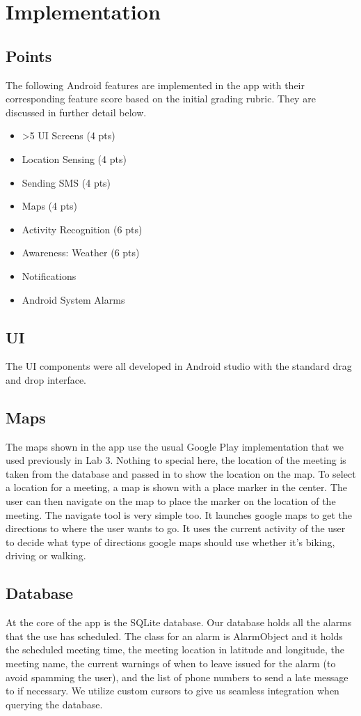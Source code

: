 \section{Implementation}
\subsection{Points}
The following Android features are implemented in the app with their corresponding feature score based on the initial grading rubric.  They are discussed in further detail below.

\begin {itemize}
	\item >5 UI Screens (4 pts)
	\item Location Sensing (4 pts)
	\item Sending SMS (4 pts)
	\item Maps (4 pts)
	\item Activity Recognition (6 pts)
	\item Awareness: Weather (6 pts)
	\item Notifications
	\item Android System Alarms
\end {itemize}

\subsection{UI}
The UI components were all developed in Android studio with the standard drag and drop interface. 

\subsection{Maps}
The maps shown in the app use the usual Google Play implementation that we used previously in Lab 3. Nothing to special here, the location of the meeting is taken from the database and passed in to show the location on the map. To select a location for a meeting, a map is shown with a place marker in the center. The user can then navigate on the map to place the marker on the location of the meeting. The navigate tool is very simple too. It launches google maps to get the directions to where the user wants to go. It uses the current activity of the user to decide what type of directions google maps should use whether it’s biking, driving or walking.

\subsection{Database}
At the core of the app is the SQLite database.  Our database holds all the alarms that the use has scheduled. The class for an alarm is AlarmObject and it holds the scheduled meeting time, the meeting location in latitude and longitude, the meeting name, the current warnings of when to leave issued for the alarm (to avoid spamming the user), and the list of phone numbers to send a late message to if necessary. We utilize custom cursors to give us seamless integration when querying the database. 

